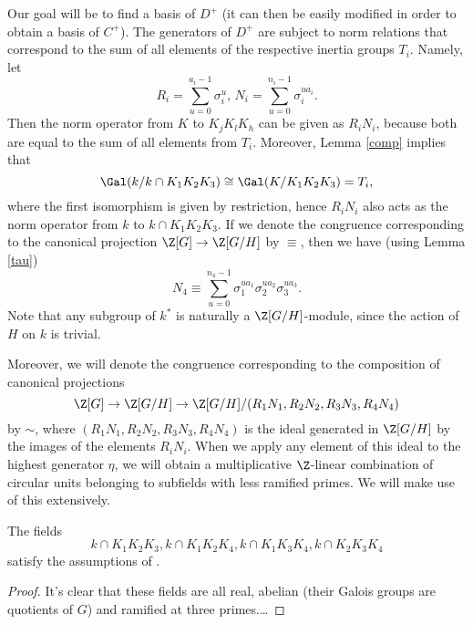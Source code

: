 Our goal will be to find a basis of $D^+$ (it can then be easily modified in order to obtain a basis of $C^+$). The generators of $D^+$ are subject to norm relations that correspond to the sum of all elements of the respective inertia groups $T_i$. Namely, let $$R_i=\sum_{u=0}^{a_i-1}\sigma_i^u,\, N_i=\sum_{u=0}^{n_i-1}\sigma_i^{ua_i}.$$ 
Then the norm operator from $K$ to $K_jK_lK_h$ can be given as $R_iN_i$, because both are equal to the sum of all elements from $T_i$. Moreover, Lemma \ref{comp} implies that $$\Gal(k/k\cap K_1K_2K_3)\cong \Gal(K/ K_1K_2K_3)=T_i,$$
where the first isomorphism is given by restriction, hence $R_iN_i$ also acts as the norm operator from $k$ to $k\cap K_1K_2K_3$.
If we denote the congruence corresponding to the canonical projection $\Z[G]\to \Z[G/H]$ by $\equiv$, then we have (using Lemma \ref{tau}) $$N_4\equiv \sum_{u=0}^{n_4-1}\sigma_1^{ua_1}\sigma_2^{ua_2}\sigma_3^{ua_3}.$$ Note that any subgroup of $k^*$ is naturally a $\Z[G/H]$-module, since the action of $H$ on $k$ is trivial.

Moreover, we will denote the congruence corresponding to the composition of canonical projections $$\Z[G]\to \Z[G/H]\to \Z[G/H]/(R_1N_1,R_2N_2,R_3N_3,R_4N_4)$$ by $\sim$, where $(R_1N_1,R_2N_2,R_3N_3,R_4N_4)$ is the ideal generated in $\Z[G/H]$ by the images of the elements $R_iN_i$. When we apply any element of this ideal to the highest generator $\eta$, we will obtain a multiplicative $\Z$-linear combination of circular units belonging to subfields with less ramified primes. We will make use of this extensively.

\begin{lemma}
The fields $$k\cap K_1K_2K_3,k\cap K_1K_2K_4,k\cap K_1K_3K_4,k\cap K_2K_3K_4$$ satisfy the assumptions of \citep{Kucera2016}.
\end{lemma}
\begin{proof}
It's clear that these fields are all real, abelian (their Galois groups are quotients of $G$) and ramified at three primes.\dots
\end{proof}

